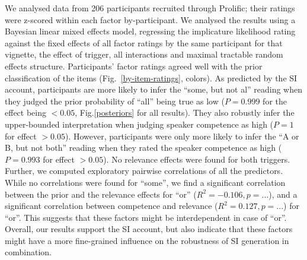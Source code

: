 \documentclass[11pt,letterpaper]{article}
\begin{document}
We analysed data from 206 participants recruited through Prolific; their ratings were z-scored within each factor by-participant. We analysed the results using a Bayesian linear mixed effects model, regressing the implicature likelihood rating against the fixed effects of all factor ratings by the same participant for that vignette, the effect of trigger, all interactions and maximal tractable random effects structure. Participants' factor ratings agreed well with the prior classification of the items (Fig.~\ref{by-item-ratings}, colors).
As predicted by the SI account, participants are more likely to infer the ``some, but not al'' reading when they judged the prior probability of ``all'' being true as low ($P=0.999$ for the effect being $<0.05$, Fig.\ref{posteriors} for all results). They also robustly infer the upper-bounded interpretation when judging speaker competence as high ($P=1$ for effect $>0.05$).
However, participants were only more likely to infer the ``A or B, but not both'' reading when they rated the speaker competence as high  ($P=0.993$ for effect $>0.05$). No relevance effects were found for both triggers.
Further, we computed exploratory pairwise correlations of all the predictors. While no correlations were found for ``some'', we find a significant correlation between the prior and the relevance effects for ``or'' ($R^2 = -0.106, p=...$), and a significant correlation between competence and relevance ($R^2 = 0.127, p=...$) for ``or''. This suggests that these factors might be interdependent in case of ``or''.
Overall, our results support the SI account, but also indicate that these factors might have a more fine-grained influence on the robustness of SI generation in combination.%
\newpage
\end{document}
